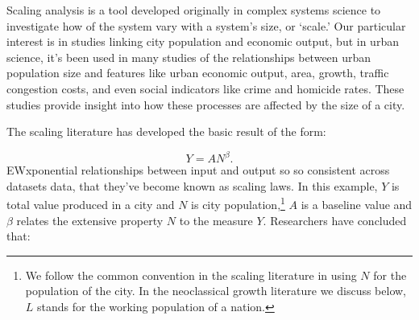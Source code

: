 Scaling analysis is a tool developed originally in \glspl{complex system} science to investigate how  of the system vary with a system's size,  or `scale.' Our particular interest is in studies linking city population and economic output, but in urban science, it's been used in many studies of the relationships between urban population size and features like urban economic output, area, growth, traffic congestion costs, and even social indicators like crime and homicide rates. These studies provide insight into how these processes are affected by the size of a city. 

The scaling literature has developed %
the basic result of the form: 

\begin{equation}
Y=AN^\beta.
\end{equation} 
EWxponential relationships between input and output so so consistent across datasets data, that they've become known as \glspl{scaling law}. In this example, $Y$ is total value produced in a city and $N$ is city population,\footnote{We follow the common convention in the scaling literature in using $N$ for the population of the city. In the neoclassical growth literature we discuss below, $L$ stands for the working population of a nation.} $A$ is a baseline value and $\beta$ relates the \gls{extensive property} $N$ to the measure $Y$. Researchers have concluded that: 

